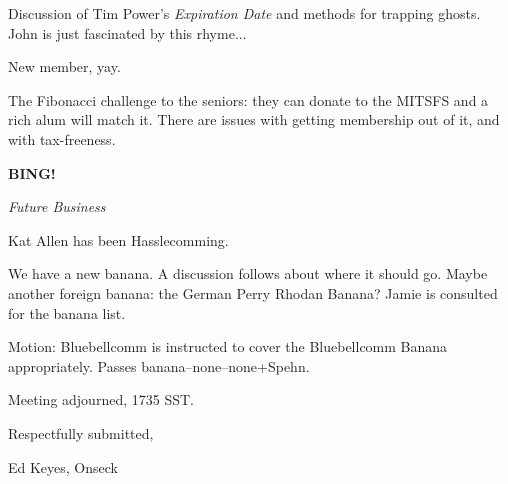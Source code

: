 \documentclass[12pt]{article}
\newcommand{\bing}{{\bf BING!} }
\newcommand{\goto}[1]{\bing \vskip 12pt \centerline{{\em{#1}}}}
\begin{document}
Discussion of Tim Power's {\em Expiration Date} and methods for
trapping ghosts.  John is just fascinated by this rhyme...

New member, yay.

The Fibonacci challenge to the seniors: they can donate to the MITSFS and
a rich alum will match it.  There are issues with getting membership
out of it, and with tax-freeness.

\goto{Future Business}

Kat Allen has been Hasslecomming.

We have a new banana.  A discussion follows about where it should go.
Maybe another foreign banana: the German Perry Rhodan Banana?  Jamie
is consulted for the banana list.

Motion: Bluebellcomm is instructed to cover the Bluebellcomm Banana
appropriately.  Passes banana--none--none+Spehn.

\vspace{12pt}

\noindent
Meeting adjourned, 1735 SST.

\vspace{18pt}

\centerline{Respectfully submitted,}
\centerline{Ed Keyes, Onseck}
\end{document}
